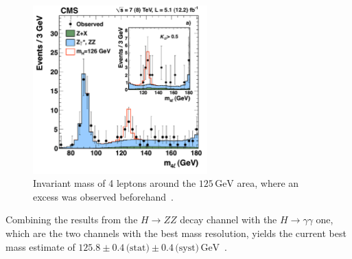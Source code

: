 \begin{figure}[ht!]
  \centering
    \includegraphics[width=0.6\textwidth]{plots/higgsmzz.pdf}
  \caption{Invariant mass of 4 leptons around the $125\,\text{GeV}$ area, where an excess was observed beforehand~\cite{higgsmzz}.}
  \label{fig:higgsmzz}
\end{figure}

\noindent Combining the results from the $H \rightarrow ZZ$ decay channel with the $H \rightarrow \gamma \gamma$ one, which are the two channels with the best mass resolution, yields the current best mass estimate of $125.8 \pm 0.4 \,\text{(stat)} \pm 0.4\,\text{(syst)}\,\text{GeV}$~\cite{higgsmzz}.


